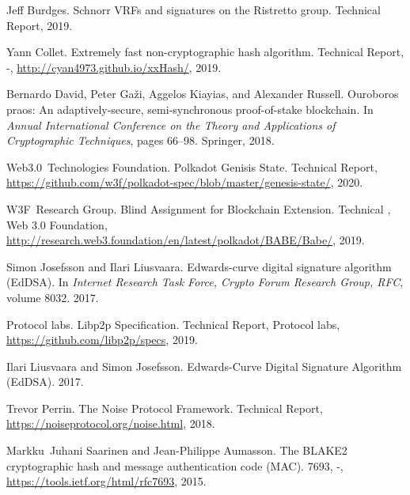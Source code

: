 \documentclass{book}
\newcommand{\tmtextit}[1]{{\itshape{#1}}}
\providecommand{\tmtextit}[1]{\tmtextit{#1}}
\begin{document}
\begin{thebibliography}{DGKR18}
  Jeff Burdges. {\newblock}Schnorr VRFs
  and signatures on the Ristretto group. {\newblock}Technical Report,
  2019.{\newblock}
  
  Yann Collet. {\newblock}Extremely fast
  non-cryptographic hash algorithm. {\newblock}Technical Report, -,
  \url{http://cyan4973.github.io/xxHash/}, 2019.{\newblock}
  
  Bernardo David, Peter Ga{\v z}i,
  Aggelos Kiayias, and  Alexander Russell. {\newblock}Ouroboros praos: An
  adaptively-secure, semi-synchronous proof-of-stake blockchain. {\newblock}In
  \tmtextit{Annual International Conference on the Theory and Applications of
  Cryptographic Techniques},  pages  66--98. Springer, 2018.{\newblock}
  
  Web3.0~Technologies
  Foundation. {\newblock}Polkadot Genisis State. {\newblock}Technical Report,
  \url{https://github.com/w3f/polkadot-spec/blob/master/genesis-state/},
  2020.{\newblock}
  
  W3F~Research Group.
  {\newblock}Blind Assignment for Blockchain Extension. {\newblock}Technical
  {}, Web 3.0 Foundation,
  \url{http://research.web3.foundation/en/latest/polkadot/BABE/Babe/},
  2019.{\newblock}
  
  Simon Josefsson  and  Ilari
  Liusvaara. {\newblock}Edwards-curve digital signature algorithm (EdDSA).
  {\newblock}In \tmtextit{Internet Research Task Force, Crypto Forum Research
  Group, RFC},  volume  8032. 2017.{\newblock}
  
  Protocol labs. {\newblock}Libp2p
  Specification. {\newblock}Technical Report, Protocol labs,
  \url{https://github.com/libp2p/specs}, 2019.{\newblock}
  
  Ilari Liusvaara  and  Simon
  Josefsson. {\newblock}Edwards-Curve Digital Signature Algorithm (EdDSA).
  {\newblock}2017.{\newblock}
  
  Trevor Perrin. {\newblock}The Noise
  Protocol Framework. {\newblock}Technical Report,
  \url{https://noiseprotocol.org/noise.html}, 2018.{\newblock}
  
  Markku~Juhani Saarinen  and 
  Jean-Philippe Aumasson. {\newblock}The BLAKE2 cryptographic hash and message
  authentication code (MAC). {\newblock}{} 7693, -,
  \url{https://tools.ietf.org/html/rfc7693}, 2015.{\newblock}
  

\end{thebibliography}
\end{document}
